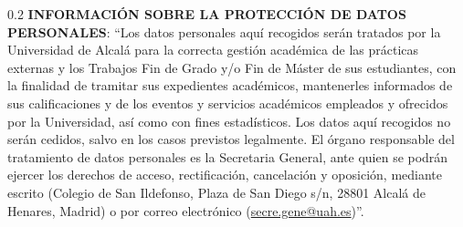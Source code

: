 %

\begin{spacing}{0.2}
{\footnotesize \noindent \textbf{INFORMACIÓN SOBRE LA PROTECCIÓN DE DATOS PERSONALES}: ``Los datos personales aquí recogidos serán tratados por la Universidad de Alcalá para la correcta gestión académica de las prácticas externas y los Trabajos Fin de Grado y/o Fin de Máster de sus estudiantes, con la finalidad de tramitar sus expedientes académicos, mantenerles informados de sus calificaciones y de los eventos y servicios académicos empleados y ofrecidos por la Universidad, así como con fines estadísticos. Los datos aquí recogidos no serán cedidos, salvo en los casos previstos legalmente. El órgano responsable del tratamiento de datos personales es la Secretaria General, ante quien se podrán ejercer los derechos de acceso, rectificación, cancelación y oposición, mediante escrito (Colegio de San Ildefonso, Plaza de San Diego s/n, 28801 Alcalá de Henares, Madrid) o por correo electrónico (\href{secre.gene@uah.es}{secre.gene@uah.es})''.}
\end{spacing}

